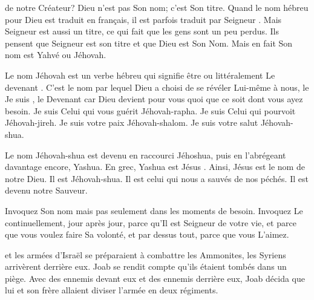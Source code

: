  de notre Créateur?
 \og Dieu \fg{} n'est pas Son nom; c'est Son titre.
 Quand le nom hébreu pour Dieu est traduit en français,
 il est parfois traduit par \og Seigneur \fg{}.
 Mais \og Seigneur \fg{} est aussi un titre,
 ce qui fait que les gens sont un peu perdus.
 Ils pensent que \og Seigneur \fg{} est son titre
 et que \og Dieu \fg{} est Son Nom.
 Mais en fait Son nom est Yahvé ou Jéhovah. 

Le nom Jéhovah est un verbe hébreu qui signifie \og être \fg{}
 ou littéralement \og Le devenant \fg{}.
 C'est le nom par lequel Dieu a choisi de se révéler Lui-même à nous,
 le \og Je suis \fg{}, le \og Devenant \fg{} car Dieu devient pour vous
 quoi que ce soit dont vous ayez besoin.
 Je suis Celui qui vous guérit \ocadr Jéhovah-rapha.
 Je suis Celui qui pourvoit \ocadr Jéhovah-jireh.
 Je suis votre paix \ocadr Jéhovah-shalom.
 Je suis votre salut \ocadr Jéhovah-shua. 

Le nom Jéhovah-shua est devenu en raccourci Jéhoshua,
 puis en l'abrégeant davantage encore, Yashua.
 En grec, Yashua est \og Jésus \fg{}.
 Ainsi, Jésus est le nom de notre Dieu. Il est Jéhovah-shua.
 Il est celui qui nous a sauvés de nos péchés. Il est devenu notre Sauveur.


Invoquez Son nom \ocadr mais pas seulement dans les moments de besoin.
 Invoquez Le continuellement, jour après jour, parce qu'Il est Seigneur
 de votre vie, et parce que vous voulez faire Sa volonté, et par dessus
 tout, parce que vous L'aimez.

\dvrule






 et les armées d'Israël se préparaient
 à combattre les Ammonites, les Syriens arrivèrent derrière eux.
 Joab se rendit compte qu'ils étaient tombés dans un piège.
 Avec des ennemis devant eux et des ennemis derrière eux,
 Joab décida que lui et son frère allaient diviser
 l'armée en deux régiments. 

